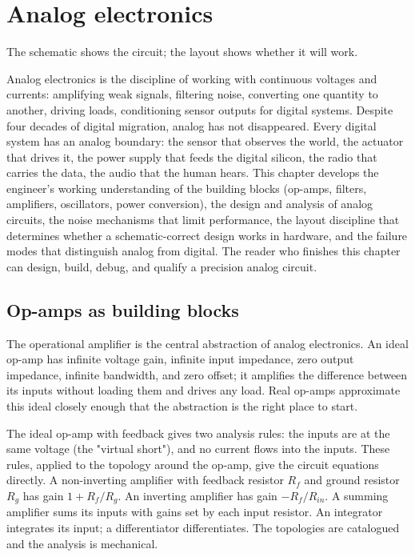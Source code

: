 \chapter{Analog electronics}
\label{vol08:ch08}

\epigraph{The schematic shows the circuit; the layout shows whether it will work.}{}


\noindent
Analog electronics is the discipline of working with continuous voltages and currents: amplifying weak signals, filtering noise, converting one quantity to another, driving loads, conditioning sensor outputs for digital systems. Despite four decades of digital migration, analog has not disappeared. Every digital system has an analog boundary: the sensor that observes the world, the actuator that drives it, the power supply that feeds the digital silicon, the radio that carries the data, the audio that the human hears. This chapter develops the engineer's working understanding of the building blocks (op-amps, filters, amplifiers, oscillators, power conversion), the design and analysis of analog circuits, the noise mechanisms that limit performance, the layout discipline that determines whether a schematic-correct design works in hardware, and the failure modes that distinguish analog from digital. The reader who finishes this chapter can design, build, debug, and qualify a precision analog circuit.

\section{Op-amps as building blocks}

The operational amplifier is the central abstraction of analog electronics. An ideal op-amp has infinite voltage gain, infinite input impedance, zero output impedance, infinite bandwidth, and zero offset; it amplifies the difference between its inputs without loading them and drives any load. Real op-amps approximate this ideal closely enough that the abstraction is the right place to start.

The ideal op-amp with feedback gives two analysis rules: the inputs are at the same voltage (the "virtual short"), and no current flows into the inputs. These rules, applied to the topology around the op-amp, give the circuit equations directly. A non-inverting amplifier with feedback resistor $R_f$ and ground resistor $R_g$ has gain $1 + R_f/R_g$. An inverting amplifier has gain $-R_f/R_{in}$. A summing amplifier sums its inputs with gains set by each input resistor. An integrator integrates its input; a differentiator differentiates. The topologies are catalogued and the analysis is mechanical.

